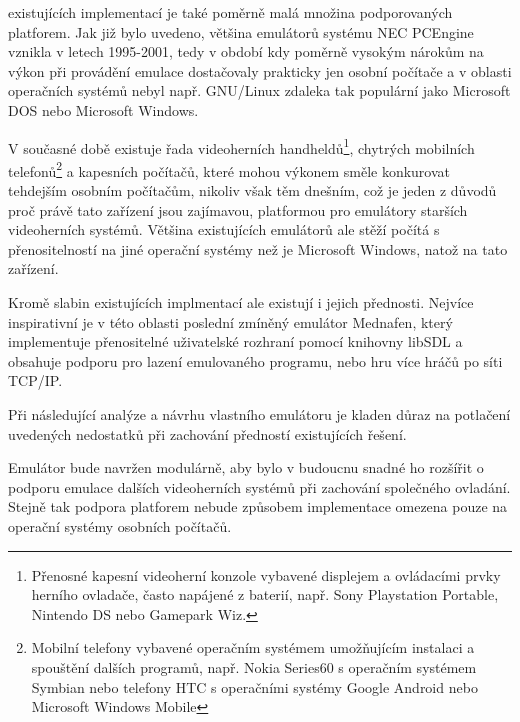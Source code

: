  existujících implementací je také poměrně malá množina
podporovaných platforem. Jak již bylo uvedeno, většina emulátorů systému NEC
PCEngine vznikla v letech 1995-2001, tedy v období kdy poměrně vysokým nárokům
na výkon při provádění emulace dostačovaly prakticky jen osobní počítače a v
oblasti operačních systémů nebyl např. GNU/Linux zdaleka tak populární jako
Microsoft DOS nebo Microsoft Windows.

V současné době existuje řada videoherních handheldů\footnote{Přenosné kapesní
videoherní konzole vybavené displejem a ovládacími prvky herního ovladače,
často napájené z baterií, např. Sony Playstation Portable, Nintendo DS nebo
Gamepark Wiz.}, chytrých mobilních telefonů\footnote{Mobilní telefony vybavené
operačním systémem umožňujícím instalaci a spouštění dalších programů, např.
Nokia Series60 s operačním systémem Symbian nebo telefony HTC s operačními
systémy Google Android nebo Microsoft Windows Mobile} a kapesních počítačů,
které mohou výkonem směle konkurovat tehdejším osobním počítačům, nikoliv však
těm dnešním, což je jeden z důvodů proč právě tato zařízení jsou zajímavou,
platformou pro emulátory starších videoherních systémů. Většina existujících
emulátorů ale stěží počítá s přenositelností na jiné operační systémy než je
Microsoft Windows, natož na tato zařízení.

Kromě slabin existujících implmentací ale existují i jejich přednosti. Nejvíce
inspirativní je v této oblasti poslední zmíněný emulátor Mednafen, který
implementuje přenositelné uživatelské rozhraní pomocí knihovny libSDL a
obsahuje podporu pro lazení emulovaného programu, nebo hru více hráčů po síti
TCP/IP.

Při následující analýze a návrhu vlastního emulátoru je kladen důraz na
potlačení uvedených nedostatků při zachování předností existujících řešení.

Emulátor bude navržen modulárně, aby bylo v budoucnu snadné ho rozšířit
o podporu emulace dalších videoherních systémů při zachování společného
ovladání. Stejně tak podpora platforem nebude způsobem implementace omezena
pouze na operační systémy osobních počítačů.
